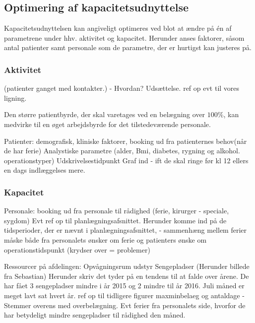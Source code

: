 \subsection{Optimering af kapacitetsudnyttelse}\label{regulerbareparametre}
Kapacitetsudnyttelsen kan angiveligt optimeres ved blot at ændre på én af parametrene under hhv. aktivitet og kapacitet. Herunder anses faktorer, såsom antal patienter samt personale som de parametre, der er hurtigst kan justeres på. 

\subsubsection{Aktivitet}\label{patientpar}

(patienter ganget med kontakter.) 
- Hvordan? Udsættelse. ref op evt til vores ligning. 

Den større patientbyrde, der skal varetages ved en belægning over $100\%$, kan medvirke til en øget arbejdsbyrde for det tilstedeværende personale.


Patienter: demografisk, kliniske faktorer, booking ud fra patienternes behov(når de har ferie) 
Analystiske parametre (alder, Bmi, diabetes, rygning og alkohol. operationstyper)
Udskrivelsestidpunkt Graf ind - ift de skal ringe før kl 12 ellers en dags indlæggelses mere. 

\subsubsection{Kapacitet}

Personale: booking ud fra personale til rådighed (ferie, kirurger - speciale, sygdom)
Evt ref op til planlægningsafsnittet. 
Herunder komme ind på de tidsperioder, der er nævnt i planlægningsafsnittet, - sammenhæng mellem ferier måske både fra personalets ønsker om ferie og patienters ønske om operationstidspunkt (krydser over = problemer)  


Ressourcer på afdelingen:
Opvågningsrum
udstyr 
Sengepladser (Herunder billede fra Sebastian) Herunder skriv det tyder på en tendens til at falde over årene. De har fået 3 sengepladser mindre i år 2015 og 2 mindre til år 2016. 
Juli måned er meget lavt sat hvert år. ref op til tidligere figurer maxminbelaeg og antaldage - Stemmer overens med overbelægning. Evt ferier fra personalets side, hvorfor de har betydeligt mindre sengepladser til rådighed den måned.


